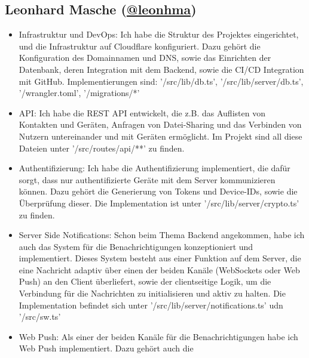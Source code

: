 \documentclass[a4paper]{article}
\begin{document}
\addto{\captionsngerman}{\renewcommand*{\contentsname}{Mitglieder}}
\setcounter{tocdepth}{2}
\localtableofcontents
\addto{\captionsngerman}{\renewcommand*{\contentsname}{Inhaltsverzeichnis}}

\subsection{Leonhard Masche (\href{https://github.com/leonhma}{@leonhma})}
\begin{itemize}
      \item Infrastruktur und DevOps: Ich habe die Struktur des Projektes
            eingerichtet, und die Infrastruktur auf Cloudflare konfiguriert.
            Dazu gehört die Konfiguration des Domainnamen und DNS, sowie das
            Einrichten der Datenbank, deren Integration mit dem Backend, sowie
            die CI/CD Integration mit GitHub. Implementierungen sind:
            '/src/lib/db.ts', '/src/lib/server/db.ts', '/wrangler.toml',
            '/migrations/*'
      \item API: Ich habe die REST API entwickelt, die z.B. das Auflisten von
            Kontakten und Geräten, Anfragen von Datei-Sharing und das Verbinden
            von Nutzern untereinander und mit Geräten ermöglicht. Im Projekt
            sind all diese Dateien unter '/src/routes/api/**' zu finden.
      \item Authentifizierung: Ich habe die Authentifizierung implementiert, die
            dafür sorgt, dass nur authentifizierte Geräte mit dem Server
            kommunizieren können. Dazu gehört die Generierung von Tokens und
            Device-IDs, sowie die Überprüfung dieser. Die Implementation ist
            unter '/src/lib/server/crypto.ts' zu finden.
      \item Server Side Notifications: Schon beim Thema Backend angekommen, habe
            ich auch das System für die Benachrichtigungen konzeptioniert und
            implementiert. Dieses System besteht aus einer Funktion auf dem
            Server, die eine Nachricht adaptiv über einen der beiden Kanäle
            (WebSockets oder Web Push) an den Client überliefert, sowie der
            clientseitige Logik, um die Verbindung für die Nachrichten zu
            initialisieren und aktiv zu halten. Die Implementation befindet sich
            unter '/src/lib/server/notifications.ts' udn '/src/sw.ts'
      \item Web Push: Als einer der beiden Kanäle für die Benachrichtigungen
            habe ich Web Push implementiert. Dazu gehört auch die

\end{itemize}
\end{document}

